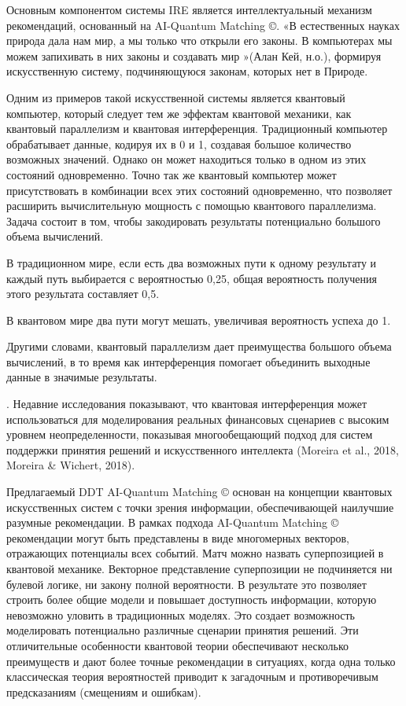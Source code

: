 Основным компонентом системы IRE является интеллектуальный механизм рекомендаций, основанный на AI-Quantum Matching ©. «В естественных науках природа дала нам мир, а мы только что открыли его законы. В компьютерах мы можем запихивать в них законы и создавать мир »(Алан Кей, н.о.), формируя искусственную систему, подчиняющуюся законам, которых нет в Природе. 

Одним из примеров такой искусственной системы является квантовый компьютер, который следует тем же эффектам квантовой механики, как квантовый параллелизм и квантовая интерференция. Традиционный компьютер обрабатывает данные, кодируя их в 0 и 1, создавая большое количество возможных значений. Однако он может находиться только в одном из этих состояний одновременно. Точно так же квантовый компьютер может присутствовать в комбинации всех этих состояний одновременно, что позволяет расширить вычислительную мощность с помощью квантового параллелизма. Задача состоит в том, чтобы закодировать результаты потенциально большого объема вычислений.

 В традиционном мире, если есть два возможных пути к одному результату и каждый путь выбирается с вероятностью 0,25, общая вероятность получения этого результата составляет 0,5. 

 В квантовом мире два пути могут мешать, увеличивая вероятность успеха до 1. 

 Другими словами, квантовый параллелизм дает преимущества большого объема вычислений,
  в то время как интерференция помогает объединить выходные данные в значимые результаты.

  . Недавние исследования показывают, что квантовая интерференция может использоваться для моделирования реальных финансовых сценариев с высоким уровнем неопределенности, показывая многообещающий подход для систем поддержки принятия решений и искусственного интеллекта (Moreira et al., 2018, Moreira & Wichert, 2018).


Предлагаемый DDT AI-Quantum Matching © основан на концепции квантовых искусственных систем с точки зрения информации, обеспечивающей наилучшие разумные рекомендации. В рамках подхода AI-Quantum Matching © рекомендации могут быть представлены в виде многомерных векторов, отражающих потенциалы всех событий. Матч можно назвать суперпозицией в квантовой механике. Векторное представление суперпозиции не подчиняется ни булевой логике, ни закону полной вероятности. В результате это позволяет строить более общие модели и повышает доступность информации, которую невозможно уловить в традиционных моделях. Это создает возможность моделировать потенциально различные сценарии принятия решений. Эти отличительные особенности квантовой теории обеспечивают несколько преимуществ и дают более точные рекомендации в ситуациях, когда одна только классическая теория вероятностей приводит к загадочным и противоречивым предсказаниям (смещениям и ошибкам).

